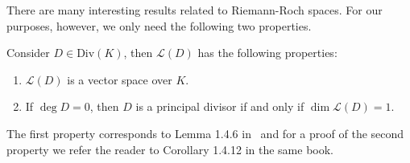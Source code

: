 There are many interesting results related to Riemann-Roch spaces. For our purposes, however, we only need the following two properties.

\begin{theorem}%
  \label{thm:riemann-roch-space-properties}
  Consider \(D \in \mathrm{Div}(K)\), then \(\mathcal{L}(D)\) has the following properties:
  \begin{enumerate}[label = {(\arabic*)}]
    \item%
      \label{prop:vector-space}
      \(\mathcal{L}(D)\) is a vector space over \(K\).

    \item%
      \label{prop:principal-dimension}
      If \(\deg{D} = 0\), then \(D\) is a principal divisor if and only if \(\dim{\mathcal{L}(D)} = 1\).
  \end{enumerate}
\end{theorem}

The first property corresponds to Lemma 1.4.6 in~\cite{stichtenoth-2009-algebraic-function-fields} and for a proof of the second property we refer the reader to Corollary 1.4.12 in the same book.
